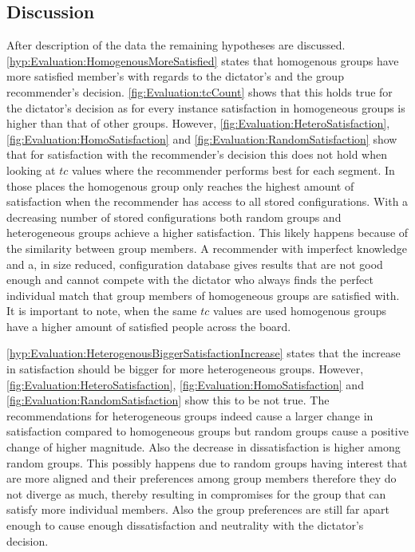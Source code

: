 \subsection{Discussion}

After description of the data the remaining hypotheses are discussed.
\autoref{hyp:Evaluation:HomogenousMoreSatisfied} states that homogenous groups have more satisfied member's with regards to the dictator's and the group recommender's decision. \autoref{fig:Evaluation:tcCount} shows that this holds true for the dictator's decision as for every instance satisfaction in homogeneous groups is higher than that of other groups. However, \autoref{fig:Evaluation:HeteroSatisfaction}, \autoref{fig:Evaluation:HomoSatisfaction} and \autoref{fig:Evaluation:RandomSatisfaction} show that for satisfaction with the recommender's decision this does not hold when looking at $tc$ values where the recommender performs best for each segment. In those places the homogenous group only reaches the highest amount of satisfaction when the recommender has access to all stored configurations. With a decreasing number of stored configurations both random groups and heterogeneous groups achieve a higher satisfaction. This likely happens because of the similarity between group members. A recommender with imperfect knowledge and a, in size reduced, configuration database gives results that are not good enough and cannot compete with the dictator who always finds the perfect individual match that group members of homogeneous groups are satisfied with. It is important to note, when the same $tc$ values are used homogenous groups have a higher amount of satisfied people across the board.

\autoref{hyp:Evaluation:HeterogenousBiggerSatisfactionIncrease} states that the increase in satisfaction should be bigger for more heterogeneous groups. However, \autoref{fig:Evaluation:HeteroSatisfaction}, \autoref{fig:Evaluation:HomoSatisfaction} and \autoref{fig:Evaluation:RandomSatisfaction} show this to be not true. The recommendations for heterogeneous groups indeed cause a larger change in satisfaction compared to homogeneous groups but random groups cause a positive change of higher magnitude. Also the decrease in dissatisfaction is higher among random groups. This possibly happens due to random groups having interest that are more aligned and their preferences among group members therefore they do not diverge as much, thereby resulting in compromises for the group that can satisfy more individual members. Also the group preferences are still far apart enough to cause enough dissatisfaction and neutrality with the dictator's decision.

